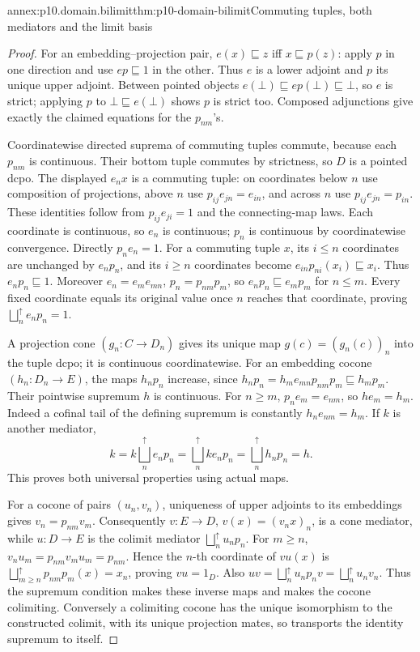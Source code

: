 \begin{annexitem}{annex:p10.domain.bilimit}{thm:p10-domain-bilimit}{Commuting tuples, both mediators and the limit basis}
\begin{proof}
For an embedding--projection pair, \(e(x)\sqsubseteq z\) iff
\(x\sqsubseteq p(z)\): apply \(p\) in one direction and use
\(ep\sqsubseteq1\) in the other. Thus \(e\) is a lower
adjoint and \(p\) its unique upper adjoint. Between pointed
objects \(e(\bot)\sqsubseteq ep(\bot)\sqsubseteq\bot\), so
\(e\) is strict; applying \(p\) to \(\bot\sqsubseteq e(\bot)\)
shows \(p\) is strict too. Composed adjunctions give exactly
the claimed equations for the \(p_{nm}\)'s.

Coordinatewise directed suprema of commuting tuples commute,
because each \(p_{nm}\) is continuous. Their bottom tuple
commutes by strictness, so \(D\) is a pointed dcpo.
The displayed \(e_nx\) is a commuting tuple: on coordinates
below \(n\) use composition of projections, above \(n\) use
\(p_{ij}e_{jn}=e_{in}\), and across \(n\) use
\(p_{ij}e_{jn}=p_{in}\). These identities follow from
\(p_{ij}e_{ji}=1\) and the connecting-map laws.
Each coordinate is continuous, so \(e_n\) is continuous;
\(p_n\) is continuous by coordinatewise convergence.
Directly \(p_ne_n=1\). For a commuting tuple \(x\), its
\(i\le n\) coordinates are unchanged by \(e_np_n\), and
its \(i\ge n\) coordinates become
\(e_{in}p_{ni}(x_i)\sqsubseteq x_i\). Thus
\(e_np_n\sqsubseteq1\). Moreover
\(e_n=e_me_{mn}\), \(p_n=p_{nm}p_m\), so
\(e_np_n\sqsubseteq e_mp_m\) for \(n\le m\).
Every fixed coordinate equals its original value once \(n\)
reaches that coordinate, proving \(\bigsqcup_n^{\uparrow}e_np_n=1\).

A projection cone \((g_n:C\to D_n)\) gives its unique map
\(g(c)=(g_n(c))_n\) into the tuple dcpo; it is continuous
coordinatewise. For an embedding cocone \((h_n:D_n\to E)\),
the maps \(h_np_n\) increase, since
\(h_np_n=h_me_{mn}p_{nm}p_m\sqsubseteq h_mp_m\).
Their pointwise supremum \(h\) is continuous. For \(n\ge m\),
\(p_ne_m=e_{nm}\), so \(he_m=h_m\).
Indeed a cofinal tail of the defining supremum is constantly
\(h_ne_{nm}=h_m\). If \(k\) is another mediator,
\[
 k=k\bigsqcup_n^{\uparrow}e_np_n
       =\bigsqcup_n^{\uparrow}ke_np_n
       =\bigsqcup_n^{\uparrow}h_np_n=h.
\]
This proves both universal properties using actual maps.

For a cocone of pairs \((u_n,v_n)\), uniqueness of upper
adjoints to its embeddings gives \(v_n=p_{nm}v_m\).
Consequently \(v:E\to D\), \(v(x)=(v_nx)_n\), is a cone
mediator, while \(u:D\to E\) is the colimit mediator
\(\bigsqcup_n^{\uparrow}u_np_n\).
For \(m\ge n\), \(v_nu_m=p_{nm}v_mu_m=p_{nm}\).
Hence the \(n\)-th coordinate of \(vu(x)\) is
\(\bigsqcup_{m\ge n}^{\uparrow}p_{nm}p_m(x)=x_n\), proving
\(vu=1_D\). Also
\(uv=\bigsqcup_n^{\uparrow}u_np_nv
=\bigsqcup_n^{\uparrow}u_nv_n\).
Thus the supremum condition makes these inverse maps and makes
the cocone colimiting. Conversely a colimiting cocone has the
unique isomorphism to the constructed colimit, with its unique
projection mates, so transports the identity supremum to itself.


\end{proof}
\end{annexitem}
